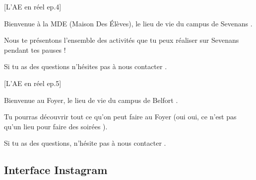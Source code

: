 [L'\gls{AE} en réel ep.4]

Bienvenue à la MDE (Maison Des Élèves), le lieu de vie du campus de Sevenans .

Nous te présentons l'ensemble des activités que tu peux réaliser sur Sevenans pendant tes pauses  !

Si tu as des questions n'hésites pas à nous contacter .

[L'\gls{AE} en réel ep.5]

Bienvenue au Foyer, le lieu de vie du campus de Belfort .

Tu pourras découvrir tout ce qu'on peut faire au Foyer  (oui oui, ce n'est pas qu'un lieu pour faire des soirées ).

Si tu as des questions, n'hésite pas à nous contacter .


\newpage

\subsection*{Interface Instagram}\label{subsec:interface-instagram}

